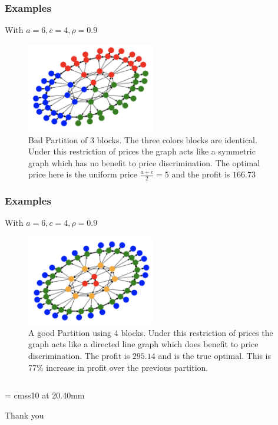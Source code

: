 \documentclass[11pt]{beamer}
\newcommand\<{\langle}
\renewcommand\>{\rangle}
\begin{document}
\begin{frame}
  \frametitle{Examples}
  With $a=6, c=4, \rho = 0.9$
  \begin{figure}
    \includegraphics[width=0.5\textwidth]{images/BadPat.png}
    \caption{Bad Partition of 3 blocks. The three colors blocks are identical. Under this restriction of prices the graph acts like a symmetric graph which has no benefit to price discrimination. The optimal price here is the uniform price $\frac{a+c}{2}=5$ and the profit is $166.73$}
    \label{fig:1}
  \end{figure}
\end{frame}

\begin{frame}
  \frametitle{Examples}
  With $a=6, c=4, \rho = 0.9$
  \begin{figure}
    \includegraphics[width=0.5\textwidth]{images/GoodPat.png}
    \caption{A good Partition using 4 blocks. Under this restriction of prices the graph acts like a directed line graph which does benefit to price discrimination. The profit is $295.14$ and is the true optimal. This is 77\% increase in profit over the previous partition. }
    \label{fig:2}
  \end{figure}
\end{frame}

\begin{frame}[plain]

  \begin{columns}
    \begin{column}{0.75\textwidth}
      \begin{center}

        \font\endfont = cmss10 at 20.40mm
        \endfont
        \baselineskip 20.0mm

        Thank you

      \end{center}

    \end{column}
  \end{columns}

\end{frame}
\end{document}
